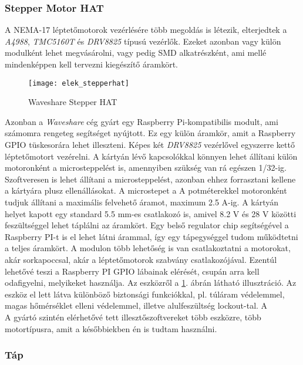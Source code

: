 \subsubsection*{Stepper Motor HAT \cite{stepperhat}}
A NEMA-17 léptetőmotorok vezérlésére több megoldás is létezik, elterjedtek a \textsl{A4988}, \textsl{TMC5160T} és \textsl{DRV8825} típusú vezérlők. Ezeket azonban vagy külön modulként lehet megvásárolni, vagy pedig SMD alkatrészként, ami mellé mindenképpen kell tervezni kiegészítő áramkört. \\

\begin{figure}[h!]
	\centering
	\texttt{[image: elek\_stepperhat]}
	\caption{Waveshare Stepper HAT \cite{stepperhat}}
	\label{fig:elek_stepperhat}
\end{figure}

Azonban a \textsl{Waveshare} cég gyárt egy Raspberry Pi-kompatibilis modult, ami számomra rengeteg segítséget nyújtott. Ez egy külön áramkör, amit a Raspberry GPIO tüskesorára lehet illeszteni. Képes két \textsl{DRV8825} vezérlővel egyszerre kettő léptetőmotort vezérelni. A kártyán lévő kapcsolókkal könnyen lehet állítani külön motoronként a microsteppelést is, amennyiben szükség van rá egészen 1/32-ig. Szoftveresen is lehet állítani a microsteppelést, azonban ehhez forrasztani kellene a kártyára plusz ellenállásokat. A microstepet a                         A potméterekkel motoronként tudjuk állítani a maximális felvehető áramot, maximum 2.5 A-ig. A kártyán helyet kapott egy standard 5.5 mm-es csatlakozó is, amivel 8.2 V és 28 V közötti feszültséggel lehet táplálni az áramkört. Egy belső regulator chip segítségével a Raspberry PI-t is el lehet látni árammal, így egy tápegységgel tudom működtetni a teljes áramkört. A modulon több lehetőség is van csatlakoztatni a motorokat, akár sorkapoccsal, akár a léptetőmotorok szabvány csatlakozójával. Ezentúl lehetővé teszi a Raspberry PI GPIO lábainak elérését, csupán arra kell odafigyelni, melyikeket használja. Az eszközről a \ref{fig:elek_stepperhat}. ábrán látható illusztráció. Az eszköz el lett látva különböző biztonsági funkciókkal, pl. túláram védelemmel, magas hőmérséklet elleni védelemmel, illetve alulfeszültség lockout-tal. A \\

A gyártó szintén elérhetővé tett illesztőszoftvereket több eszközre, több motortípusra, amit a későbbiekben én is tudtam használni.

\subsubsection*{Táp}

